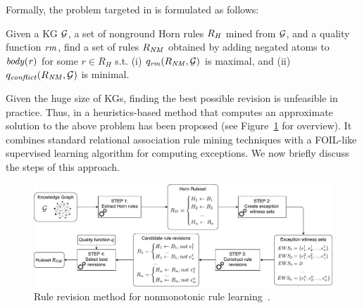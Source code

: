 Formally, the problem targeted in \cite{gad2016,rumis} is formulated as follows: 
\begin{definition} Given a KG $\mathcal{G}$,
a set of nonground Horn rules $R_{\mathit{H}}$ mined from $\mathcal{G}$, and a quality
function $\mathit{rm}$, %
find a set of rules $R_{\mathit{NM}}$ obtained by
adding negated atoms to $\mathit{body(r)}$ for some $r{\in} R_{H}$ s.t. (i)
${q_{\mathit{rm}}(R_{\mathit{NM}},\mathcal{G})}$ is maximal, and (ii)
${q_{\mathit{conflict}}(R_{\mathit{NM}},\mathcal{G})}$ is minimal.
\end{definition}



Given the huge size of KGs, finding the best possible revision is unfeasible in practice. Thus, in \cite{gad2016,rumis} a heuristics-based method that computes an approximate solution to the above problem has been proposed  (see Figure~\ref{fig:iswc_process} for overview). It combines standard relational association rule mining techniques with a FOIL-like supervised learning algorithm \cite{foil} for computing exceptions. We now briefly discuss the steps of this approach.

\begin{figure}[t]
\centering
\includegraphics[width=1\textwidth]{figures/overview_new}
\caption{Rule revision method for nonmonotonic rule learning~\cite{gad2016,rumis}.}
\label{fig:iswc_process}
\end{figure}
\bigskip

